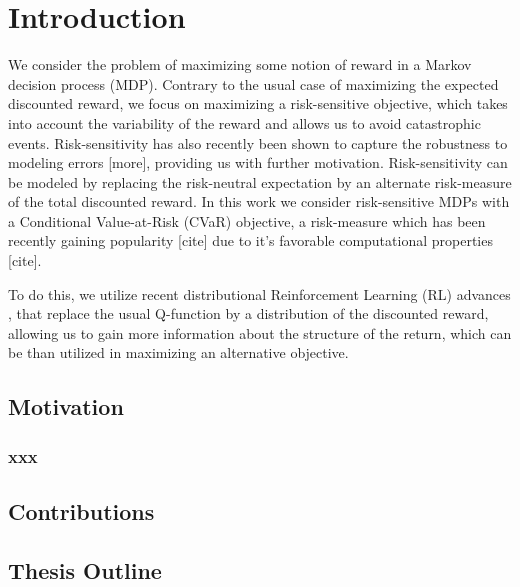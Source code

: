 \chapter{Introduction}\label{ch:introduction}
We consider the problem of maximizing some notion of reward in a Markov decision process (MDP). Contrary to the usual case of maximizing the expected discounted reward, we focus on maximizing a risk-sensitive objective, which takes into account the variability of the reward and allows us to avoid catastrophic events.
Risk-sensitivity has also recently been shown to capture the robustness to modeling errors \cite{chow2015risk} [more], providing us with further motivation.
Risk-sensitivity can be modeled by replacing the risk-neutral expectation by an alternate risk-measure of the total discounted reward. In this work we consider risk-sensitive MDPs with a Conditional Value-at-Risk (CVaR) objective, a risk-measure which has been recently gaining popularity [cite] due to it's favorable computational properties [cite].

To do this, we utilize recent distributional Reinforcement Learning (RL) advances \cite{bellemare2017distributional}\cite{dabney2017distributional}, that replace the usual Q-function by a distribution of the discounted reward, allowing us to gain more information about the structure of the return, which can be than utilized in maximizing an alternative objective.
\section{Motivation}

\subsection{xxx}




\section{Contributions}




\section{Thesis Outline}


